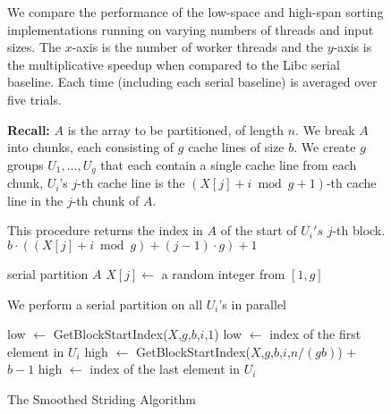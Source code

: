 \documentclass[sigplan, 10pt, nonacm]{acmart}
\theoremstyle{remark}
\theoremstyle{remark}
\begin{document}
\begin{figure*}
  \begin{center}
    \CILKsorttable
  \end{center}
  \caption{We compare the performance of the low-space and high-span
    sorting implementations running on varying numbers of threads and
    input sizes. The $x$-axis is the number of worker threads and the
    $y$-axis is the multiplicative speedup when compared to the Libc serial
    baseline. Each time (including each serial baseline)
    is averaged over five trials.}
  \label{tablesort}
\end{figure*}

\begin{figure*}
  \caption{The Smoothed Striding Algorithm}
	\label{alg:parallelPartition}
	\begin{algorithmic}%
    \State \textbf{Recall:} 
    \State $A$ is the array to be partitioned, of length $n$. 
    \State We break $A$ into chunks, each consisting of $g$ cache lines of size $b$.
    \State We create $g$ groups $U_1,\ldots, U_g$ that each contain a single cache line from each chunk,
    \State $U_i$'s $j$-th cache line is the $(X[j]+i \bmod g + 1)$-th cache line in the $j$-th chunk of $A$.
    \State

      \Comment This procedure returns the index in $A$ of the start of $U_i's$ $j$-th block.
      \State\Return $b\cdot ((X[j] + i \bmod g) +(j-1)\cdot g)+1$
    \EndProcedure
    \State

        \State serial partition $A$
      \Else
          \State $X[j] \gets$ a random integer from $[1,g]$ 
        \EndFor

         \Comment We perform a serial partition on all $U_i$'s in parallel

          \State low $\gets$ GetBlockStartIndex($X$,$g$,$b$,$i$,$1$)
          \Comment low $\gets$ index of the first element in $U_i$
          \State high $\gets$ GetBlockStartIndex($X$,$g$,$b$,$i$,$n/(gb)$) + $b-1$
          \Comment high $\gets$ index of the last element in $U_i$


\end{algorithmic}
\end{figure*}
\end{document}
